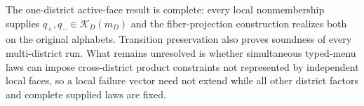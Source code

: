 The one-district active-face result is complete: every local nonmembership supplies \(q_+,q_-\in\mathcal K_D(m_D)\) and the fiber-projection construction realizes both on the original alphabets.  Transition preservation also proves soundness of every multi-district run.  What remains unresolved is whether simultaneous typed-menu laws can impose cross-district product constraints not represented by independent local faces, so a local failure vector need not extend while all other district factors and complete supplied laws are fixed.